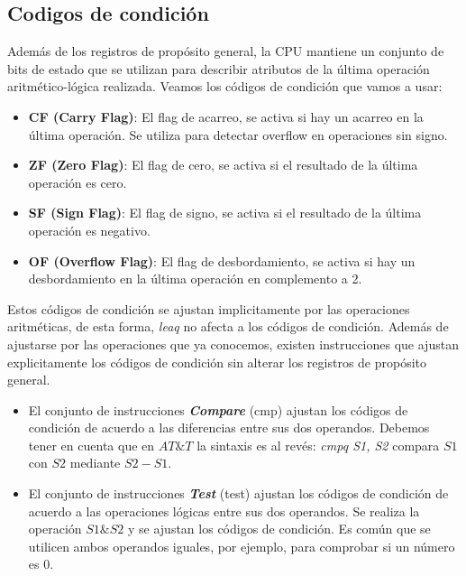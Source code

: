 \subsection{Codigos de condición}
Además de los registros de propósito general, la CPU mantiene un conjunto de bits de estado que se utilizan para
describir atributos de la última operación aritmético-lógica realizada.
Veamos los códigos de condición que vamos a usar:
\begin{itemize}
	\item \textbf{CF (Carry Flag)}: El flag de acarreo, se activa si hay un acarreo en la última operación. Se utiliza para detectar overflow en operaciones sin signo.
	\item \textbf{ZF (Zero Flag)}: El flag de cero, se activa si el resultado de la última operación es cero.
	\item \textbf{SF (Sign Flag)}: El flag de signo, se activa si el resultado de la última operación es negativo.
	\item \textbf{OF (Overflow Flag)}: El flag de desbordamiento, se activa si hay un desbordamiento en la última operación en complemento a 2.
\end{itemize}
Estos códigos de condición se ajustan implicitamente por las operaciones aritméticas, de esta forma, \textit{leaq} no afecta a los códigos de condición.
Además de ajustarse por las operaciones que ya conocemos, existen instrucciones que ajustan explicitamente los códigos de condición sin alterar los registros de propósito general.
\begin{itemize}
	\item El conjunto de instrucciones \textbf{\textit{Compare}} (cmp) ajustan los códigos de condición de acuerdo a las diferencias entre sus dos operandos. Debemos tener en cuenta que en $AT\&T$ la sintaxis
	      es al revés: \textit{cmpq S1, S2} compara $S1$ con $S2$ mediante $S2- S1$.
	\item El conjunto de instrucciones \textbf{\textit{Test}} (test) ajustan los códigos de condición de acuerdo a las operaciones lógicas entre sus dos operandos.
	      Se realiza la operación $S1 \& S2$ y se ajustan los códigos de condición. Es común que se utilicen ambos operandos iguales, por ejemplo, para
	      comprobar si un número es 0.
\end{itemize}
